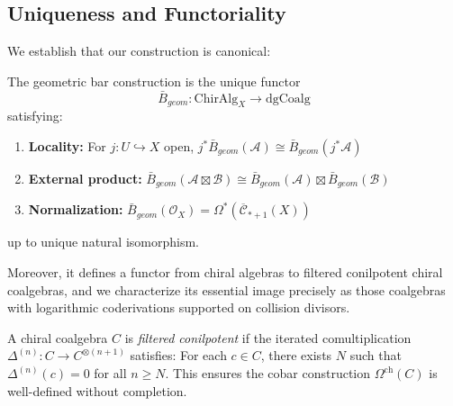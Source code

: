 \subsection{Uniqueness and Functoriality}
 
We establish that our construction is canonical:

\begin{theorem}
The geometric bar construction is the unique functor 
$$\bar{B}_{geom}: \text{ChirAlg}_X \to \text{dgCoalg}$$
satisfying:
\begin{enumerate}
\item \textbf{Locality:} For $j: U \hookrightarrow X$ open, $j^*\bar{B}_{geom}(\mathcal{A}) \cong \bar{B}_{geom}(j^*\mathcal{A})$
\item \textbf{External product:} $\bar{B}_{geom}(\mathcal{A} \boxtimes \mathcal{B}) \cong \bar{B}_{geom}(\mathcal{A}) \boxtimes \bar{B}_{geom}(\mathcal{B})$
\item \textbf{Normalization:} $\bar{B}_{geom}(\mathcal{O}_X) = \Omega^*(\overline{\mathcal{C}}_{*+1}(X))$
\end{enumerate}
up to unique natural isomorphism.

Moreover, it defines a functor from chiral algebras to filtered conilpotent chiral coalgebras, and we characterize its essential image precisely as those coalgebras with logarithmic coderivations supported on collision divisors.
\end{theorem}

 
\begin{definition}
A chiral coalgebra $C$ is \emph{filtered conilpotent} if the iterated comultiplication 
$\Delta^{(n)} : C \to C^{\otimes(n+1)}$ satisfies: For each $c \in C$, there exists 
$N$ such that $\Delta^{(n)}(c) = 0$ for all $n \geq N$. This ensures the cobar 
construction $\Omega^{\text{ch}}(C)$ is well-defined without completion.
\end{definition}



